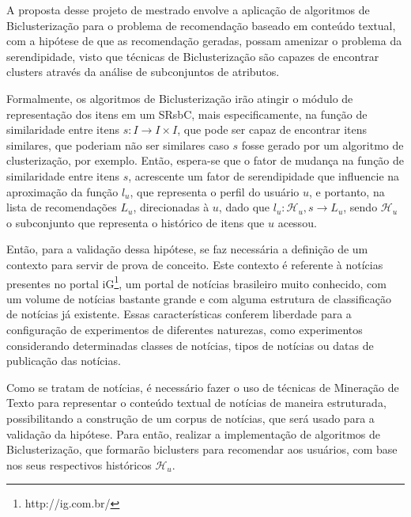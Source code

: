\documentclass[
    12pt,                %
    oneside,            %
    a4paper,            %
    english,            %
    brazil                %
    ]{abntex2ppgsi}
\begin{document}

A proposta desse projeto de mestrado envolve a aplicação de algoritmos de Biclusterização para o problema de recomendação baseado em conteúdo textual, com a hipótese de que as recomendação geradas, possam amenizar o problema da serendipidade, visto que técnicas de Biclusterização são capazes de encontrar clusters através da análise de subconjuntos de atributos.

Formalmente, os algoritmos de Biclusterização irão atingir o módulo de representação dos itens em um SRsbC, mais especificamente, na função de similaridade entre itens $s: I \rightarrow I \times I$, que pode ser capaz de encontrar itens similares, que poderiam não ser similares caso $s$ fosse gerado por um algoritmo de clusterização, por exemplo.
Então, espera-se que o fator de mudança na função de similaridade entre itens $s$, acrescente um fator de serendipidade que influencie na aproximação da função $l_u$, que representa o perfil do usuário $u$, e portanto, na lista de recomendações $L_u$, direcionadas à $u$, dado que $l_u: \mathcal{H}_u, s \rightarrow L_u$, sendo $\mathcal{H}_u$ o subconjunto que representa o histórico de itens que $u$ acessou.

Então, para a validação dessa hipótese, se faz necessária a definição de um contexto para servir de prova de conceito.
Este contexto é referente à notícias presentes no portal iG\footnote{http://ig.com.br/}, um portal de notícias brasileiro muito conhecido, com um volume de notícias bastante grande e com alguma estrutura de classificação de notícias já existente.
Essas características conferem liberdade para a configuração de experimentos de diferentes naturezas, como experimentos considerando determinadas classes de notícias, tipos de notícias ou datas de publicação das notícias.

Como se tratam de notícias, é necessário fazer o uso de técnicas de Mineração de Texto para representar o conteúdo textual de notícias de maneira estruturada, possibilitando a construção de um corpus de notícias, que será usado para a validação da hipótese.
Para então, realizar a implementação de algoritmos de Biclusterização, que formarão biclusters para recomendar aos usuários, com base nos seus respectivos históricos $\mathcal{H}_u$.
\end{document}
